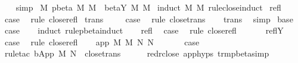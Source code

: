 \begin{isabellebody}
\ \ \isamarkupfalse%
\ simp\isanewline
{}\isamarkupfalse%
%
\endisatagproof
{\isafoldproof}%
%
\isadelimproof
\isanewline
%
\endisadelimproof
\isanewline
{}\isamarkupfalse%
\ M{}{\isacharcolon}\ {\isachardoublequoteopen}pbeta{\isacharasterisk}\ M\ M{\isacharprime}\ {\isasymLongrightarrow}\ beta{\isacharunderscore}Y{\isacharasterisk}\ M\ M{\isacharprime}{\isachardoublequoteclose}\isanewline
%
\isadelimproof
%
\endisadelimproof
%
\isatagproof
{}\isamarkupfalse%
\ {\isacharparenleft}induct\ M\ M{\isacharprime}\ rule{\isacharcolon}close{\isachardot}induct{\isacharparenright}\isanewline
{}\isamarkupfalse%
\ refl\ \isamarkupfalse%
\ {\isacharquery}case\ \isamarkupfalse%
\ {\isacharparenleft}rule\ close{\isachardot}refl{\isacharparenright}\isanewline
{}\isamarkupfalse%
\isanewline
{}\isamarkupfalse%
\ trans\ \isanewline
\ \ \isamarkupfalse%
\ {\isacharquery}case\ \isamarkupfalse%
\ {\isacharparenleft}rule\ close{\isachardot}trans{\isacharparenright}\isanewline
\ \ \isamarkupfalse%
\ trans\ \isamarkupfalse%
\ simp{\isacharplus}\isanewline
{}\isamarkupfalse%
\isanewline
{}\isamarkupfalse%
\ base\ \isamarkupfalse%
\ {\isacharquery}case\isanewline
\ \ \isamarkupfalse%
\ {\isacharparenleft}induct\ rule{\isacharcolon}pbeta{\isachardot}induct{\isacharparenright}\isanewline
\ \ \isamarkupfalse%
\ refl\ \isamarkupfalse%
\ {\isacharquery}case\ \isamarkupfalse%
\ {\isacharparenleft}rule\ close{\isachardot}refl{\isacharparenright}\isanewline
\ \ \isamarkupfalse%
\isanewline
\ \ \isamarkupfalse%
\ reflY\ \isamarkupfalse%
\ {\isacharquery}case\ \isamarkupfalse%
\ {\isacharparenleft}rule\ close{\isachardot}refl{\isacharparenright}\isanewline
\ \ \isamarkupfalse%
\ {\isacharparenleft}app\ M\ M{\isacharprime}\ N\ N{\isacharprime}{\isacharparenright}\ \isanewline
\ \ \ \ \isamarkupfalse%
\ {\isacharquery}case\isanewline
\ \ \ \ \isamarkupfalse%
\ {\isacharparenleft}rule{\isacharunderscore}tac\ b{\isacharequal}{\isachardoublequoteopen}App\ M\ N{\isacharprime}{\isachardoublequoteclose}\ \ close{\isachardot}trans{\isacharparenright}\isanewline
\ \ \ \ \isamarkupfalse%
\ red{\isacharunderscore}r{\isacharunderscore}close\ app{\isachardot}hyps{\isacharparenleft}{}{\isacharcomma}{}{\isacharparenright}\ trm{\isacharunderscore}pbeta{\isacharunderscore}simp{}\ \isamarkupfalse%

\end{isabellebody}
